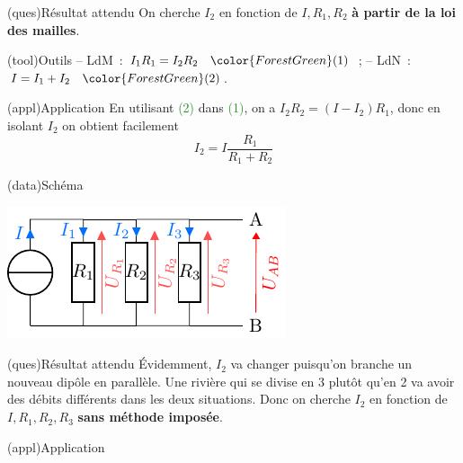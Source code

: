 \documentclass[../../main/main.tex]{subfiles}
\begin{document}
{\begin{tcbraster}[raster columns=3, raster equal height=rows]
    \begin{tcb}(ques){Résultat attendu}
        On cherche $I_2$ en fonction de $I, R_1, R_2$ \textbf{à partir de la loi
        des mailles}.
    \end{tcb}
    \begin{tcb}(tool){Outils}
        -- LdM~: $I_1R_1 = I_2R_2 \quad \color{ForestGreen}(1)$~;
        \smallbreak
        -- LdN~: $I = I_1 + I_2 \quad \color{ForestGreen}(2)$.
    \end{tcb}
    \begin{tcb}(appl){Application}
        En utilisant \textcolor{ForestGreen}{(2)} dans
        \textcolor{ForestGreen}{(1)}, on a $I_2R_2 = (I-I_2)R_1$, donc en
        isolant $I_2$ on obtient facilement \[\boxed{I_2 = I
        \frac{R_1}{R_1+R_2}}\]
    \end{tcb}
\end{tcbraster}
\begin{tcbraster}[raster columns=7, raster equal height=rows]
    \begin{tcolorbox}[blankest, raster multicolumn=4, space to=\myspace]
        \begin{tcbraster}[raster columns=1]
    \begin{tcb}(data){Schéma}
        \begin{center}
            \includegraphics{divcour_3}
        \end{center}
    \end{tcb}
    \begin{tcb}(ques){Résultat attendu}
        Évidemment, $I_2$ va changer puisqu'on branche un nouveau dipôle en
        parallèle. Une rivière qui se divise en 3 plutôt qu'en 2 va avoir des
        débits différents dans les deux situations. Donc on cherche $I_2$ en
        fonction de $I, R_1, R_2, R_3$ \textbf{sans méthode imposée}.
    \end{tcb}
        \end{tcbraster}
    \end{tcolorbox}
    \begin{tcb}[raster multicolumn=3](appl){Application}

\end{tcb}
\end{tcbraster}}
\end{document}
